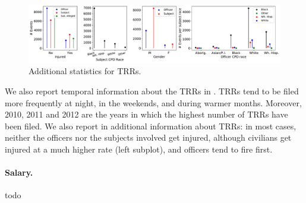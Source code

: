 \begin{figure}[t!] 
	\includegraphics[width=\textwidth]{figs/trr_stats} 
	\caption{Additional statistics for TRRs.} \label{fig:trrs_stats1}
\end{figure}

We also report temporal information about the TRRs in . TRRs tend to be filed more frequently at night, in the weekends, and during warmer months. Moreover, 2010, 2011 and 2012 are the years in which the highest number of TRRs have been filed. We also report in  additional information about TRRs: in most cases, neither the officers nor the subjects involved get injured, although civilians get injured at a much higher rate (left subplot), and officers tend to fire first. 
\paragraph{Salary.} todo

